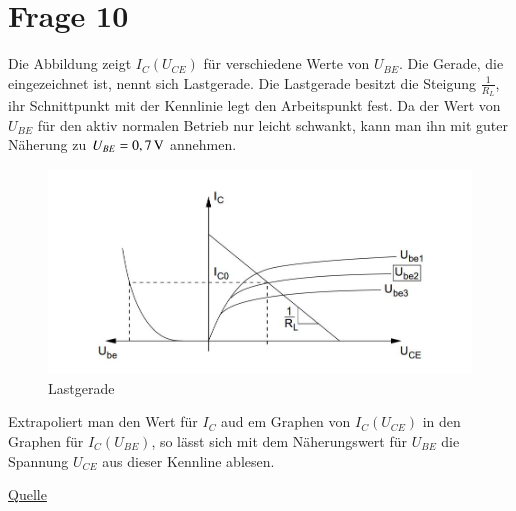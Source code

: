 \newpage


\section{Frage 10}


Die Abbildung zeigt $I_C (U_{CE})$ für verschiedene Werte von $U_{BE}$. Die Gerade, die eingezeichnet ist, nennt sich Lastgerade. Die Lastgerade besitzt die Steigung $\frac{1}{R_L}$, ihr Schnittpunkt mit der Kennlinie legt den Arbeitspunkt fest. Da der Wert von $U_{BE}$ für den aktiv normalen Betrieb nur leicht schwankt, kann man ihn mit guter Näherung zu $U_{BE} = \unit[0,7]{V}$ annehmen. 

\begin{figure}[h]
	\centering
	\includegraphics[scale=0.5]{Lastgerade.jpg}
	\caption{Lastgerade}
\end{figure}

Extrapoliert man den Wert für $I_C$ aud em Graphen von $I_C(U_{CE})$ in den Graphen für $I_C(U_{BE})$, so lässt sich mit dem Näherungswert für $U_{BE}$ die Spannung $U_{CE}$ aus dieser Kennline ablesen.


\href{http://www.uni-saarland.de/fileadmin/user_upload/Professoren/fr74_ProfMoeller/Praktikum/P_SS08/Transistorgrundschaltung_13_06_08.pdf}{Quelle}




